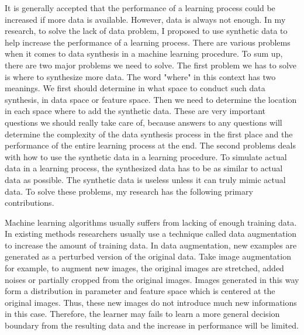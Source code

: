 \documentclass{iitthesis}
\begin{document}
It is generally accepted that the performance of a learning process could be increased if more data is available. However, data is always not enough. In my research, to solve the lack of data problem, I proposed to use synthetic data to help increase the performance of a learning process. There are various problems when it comes to data synthesis in a machine learning procedure. To sum up, there are two major problems we need to solve. The first problem we has to solve is where to synthesize more data. The word "where" in this context has two meanings. We first should determine in what space to conduct such data synthesis, in data space or feature space. Then we need to determine the location in each space where to add the synthetic data. These are very important questions we should really take care of, because answers to any questions will determine the complexity of the data synthesis process in the first place and the performance of the entire learning process at the end. The second problems deals with how to use the synthetic data in a learning procedure. To simulate actual data in a learning process, the synthesized data has to be as similar to actual data as possible. The synthetic data is useless unless it can truly mimic actual data. To solve these problems, my research has the following primary contributions.

 Machine learning algorithms usually suffers from lacking of enough training data. In existing methods researchers usually use a technique called data augmentation to increase the amount of training data. In data augmentation, new examples are generated as a perturbed version of the original data. Take image augmentation for example, to augment new images, the original images are stretched, added noises or partially cropped from the original images. Images generated in this way form a distribution in parameter and feature space which is centered at the original images. Thus, these new images do not introduce much new informations in this case. Therefore, the learner may fails to learn a more general decision boundary from the resulting data and the increase in performance will be limited.
\end{document}
